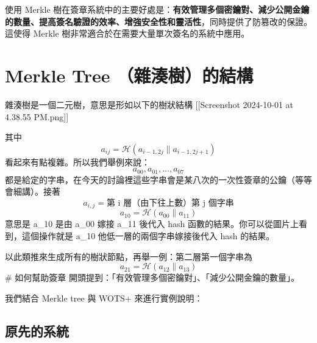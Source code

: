 \documentclass[
]{article}
\author{}
\date{}
\begin{document}
使用 Merkle
樹在簽章系統中的主要好處是：\textbf{有效管理多個密鑰對、減少公開金鑰的數量、提高簽名驗證的效率、增強安全性和靈活性}，同時提供了防篡改的保證。這使得
Merkle 樹非常適合於在需要大量單次簽名的系統中應用。

\hypertarget{merkle-tree-ux96dcux6e4aux6a39ux7684ux7d50ux69cb}{%
\section{Merkle Tree
（雜湊樹）的結構}\label{merkle-tree-ux96dcux6e4aux6a39ux7684ux7d50ux69cb}}

雜湊樹是一個二元樹，意思是形如以下的樹狀結構 {[}{[}Screenshot 2024-10-01
at 4.38.55 PM.png{]}{]}

其中 \[
a_{ij} = \mathcal{H}(a_{i-1,2j}\| a_{i-1,2j+1})
\] 看起來有點複雜。所以我們舉例來說： \[
a_{00} ,a_{01},\dots,a_{07}
\]
都是給定的字串，在今天的討論裡這些字串會是某八次的一次性簽章的公鑰（等等會細講）。接著
\[
a_{i,j} = \text{第 i 層（由下往上數）第 j 個字串} 
\] \[
a_{10} = \mathcal{H}(a_{00}\|a_{11})
\] 意思是 a\_10 是由 a\_00 嫁接 a\_11 後代入 hash
函數的結果。你可以從圖片上看到，這個操作就是 a\_10
他低一層的兩個字串嫁接後代入 hash 的結果。

以此類推來生成所有的樹狀節點，再舉一例：第二層第一個字串為 \[
a_{21} = \mathcal{H}(a_{12}\|a_{13})
\] \# 如何幫助簽章
開頭提到：「有效管理多個密鑰對」、「減少公開金鑰的數量」。

我們結合 Merkle tree 與 WOTS+ 來進行實例說明：

\hypertarget{ux539fux5148ux7684ux7cfbux7d71}{%
\subsection{原先的系統}\label{ux539fux5148ux7684ux7cfbux7d71}}
\end{document}
